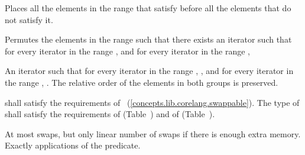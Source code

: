 \begin{itemdescr}
\pnum
\begin{removedblock}
\effects
Places all the elements in the range
that satisfy  before all the
elements that do not satisfy it.
\end{removedblock}

\begin{addedblock}
\effects Permutes the elements in the range  such that there exists an iterator 
such that for every iterator  in the range 
, and for every iterator  in the
range , 
\end{addedblock}

\pnum
\returns
An iterator
such that for every iterator
in the range
,
,
and for every iterator
in the range
,
.
The relative order of the elements in both groups is preserved.

\begin{removedblock}
\pnum
\requires
{} shall satisfy the requirements of
~(\ref{concepts.lib.corelang.swappable}). The type
of  shall satisfy the requirements of
 (Table~) and of
 (Table~).
\end{removedblock}

\pnum
\complexity
At most
swaps, but only linear number of swaps if there is enough extra memory.
Exactly
applications of the predicate.
\end{itemdescr}

